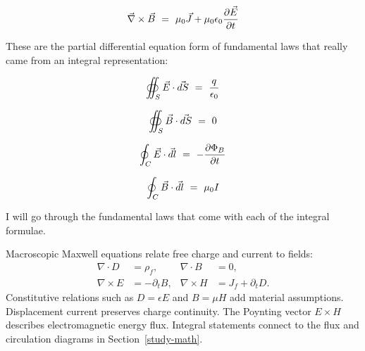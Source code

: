 \documentclass{article}
\newcounter{subsubsubsection}[subsubsection]
\begin{document}
\begin{equation} \label{eb-eq-4-1}
\vec{\nabla} \times \vec{B} \hspace{0.125cm} = \hspace{0.125cm} \mu_0\vec{J} +  \mu_0\epsilon_0\frac{\partial{\vec{E}}}{\partial{t}}
\end{equation}

These are the partial differential equation form of fundamental laws that really came from an integral representation:

\begin{equation} \label{eb-eq-5-1}
\oiint_S \vec{E}\cdot\vec{dS} \hspace{0.125cm} = \hspace{0.125cm} \frac{q}{\epsilon_0}
\end{equation}

\begin{equation} \label{eb-eq-6-1}
\oiint_S \vec{B}\cdot\vec{dS} \hspace{0.125cm} = \hspace{0.125cm} 0
\end{equation}

\begin{equation} \label{eb-eq-7-1}
\oint_C \vec{E}\cdot\vec{dl} \hspace{0.125cm} = \hspace{0.125cm} -\frac{\partial{\Phi_B}}{\partial{t}}
\end{equation}

\begin{equation} \label{eb-eq-8-1}
\oint_C \vec{B}\cdot\vec{dl} \hspace{0.125cm} = \hspace{0.125cm} \mu_0I
\end{equation}

I will go through the fundamental laws that come with each of the integral formulae. 

Macroscopic Maxwell equations relate free charge and current to fields:
\begin{align}
\nabla\cdot D&=\rho_f,&\nabla\cdot B&=0,\\
\nabla\times E&=-\partial_t B,&\nabla\times H&=J_f+\partial_tD.
\end{align}
Constitutive relations such as $D=\epsilon E$ and $B=\mu H$ add material assumptions. Displacement current preserves charge continuity. The Poynting vector $E\times H$ describes electromagnetic energy flux. Integral statements connect to the flux and circulation diagrams in Section~\ref{study-math}.
\end{document}
